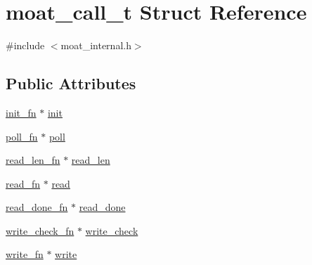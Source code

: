 \hypertarget{structmoat__call__t}{\section{moat\-\_\-call\-\_\-t Struct Reference}
\label{structmoat__call__t}
}


{\ttfamily \#include $<$moat\-\_\-internal.\-h$>$}

\subsection*{Public Attributes}
\begin{DoxyCompactItemize}
\item 
\hyperlink{moat__internal_8h_a07d18b438c0a724a0cc8ebacac66b7f8}{init\-\_\-fn} $\ast$ \hyperlink{structmoat__call__t_a883c0fc11905fceaf1a8e720acfabef6}{init}
\item 
\hyperlink{moat__internal_8h_a922b8d86a9d68ff8833add121abbf297}{poll\-\_\-fn} $\ast$ \hyperlink{structmoat__call__t_a5ddda0c0889ec1f54c869ce3770258b4}{poll}
\item 
\hyperlink{moat__internal_8h_af1c576e31c7613f87e0fbc6d557d3967}{read\-\_\-len\-\_\-fn} $\ast$ \hyperlink{structmoat__call__t_a3092921758d95baf09cf3d489574ac3a}{read\-\_\-len}
\item 
\hyperlink{moat__internal_8h_aa1c9f75bd93d742fc465caab8790c57e}{read\-\_\-fn} $\ast$ \hyperlink{structmoat__call__t_a3bc9153322aa3df0bb573d04ce425db9}{read}
\item 
\hyperlink{moat__internal_8h_ad343b7b3aa64942922d1be815fd92056}{read\-\_\-done\-\_\-fn} $\ast$ \hyperlink{structmoat__call__t_a521a394e58d41f5f171402674107d054}{read\-\_\-done}
\item 
\hyperlink{moat__internal_8h_a507dde93db9c2398c1f69dbd6ccd0e93}{write\-\_\-check\-\_\-fn} $\ast$ \hyperlink{structmoat__call__t_ae99579d7f92a1edcb167dfe47fd9e283}{write\-\_\-check}
\item 
\hyperlink{moat__internal_8h_a487b499b005966352670a06e954ab5c3}{write\-\_\-fn} $\ast$ \hyperlink{structmoat__call__t_a2939e23081a18f1cb41df7f55e8c2c6a}{write}
\end{DoxyCompactItemize}


